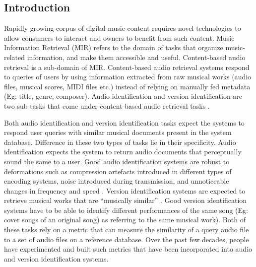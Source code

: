 \documentclass[../main.tex]{subfiles}
\begin{document}
\subsection{Introduction}

\par
Rapidly growing corpus of digital music content requires novel technologies to allow consumers to interact and owners to benefit from such content. Music Information Retrieval (\gls{MIR}) refers to the domain of tasks that organize music-related information, and make them accessible and useful. Content-based audio retrieval is a sub-domain of \gls{MIR}. Content-based audio retrieval systems respond to queries of users by using information extracted from raw musical works (audio files, musical scores, \gls{MIDI} files etc.) instead of relying on manually fed metadata (Eg: title, genre, composer). Audio identification and version identification are two sub-tasks that come under content-based audio retrieval tasks \cite{book}.

\par
Both audio identification and version identification tasks expect the systems to respond user queries with similar musical documents present in the system database. Difference in these two types of tasks lie in their specificity. Audio identification expects the system to return audio documents that perceptually sound the same to a user. Good audio identification systems are robust to deformations such as compression artefacts introduced in different types of encoding systems, noise introduced during transmission, and unnoticeable changes in frequency and speed \cite{book}. Version identification systems are expected to retrieve musical works that are “musically similar” \cite{serraAudioCoverSong2010}. Good version identification systems have to be able to identify different performances of the same song (Eg: cover songs of an original song) as referring to the same musical work). Both of these tasks rely on a metric that can measure the similarity of a query audio file to a set of audio files on a reference database. Over the past few decades, people have experimented and built such metrics that have been incorporated into audio and version identification systems.
\end{document}
